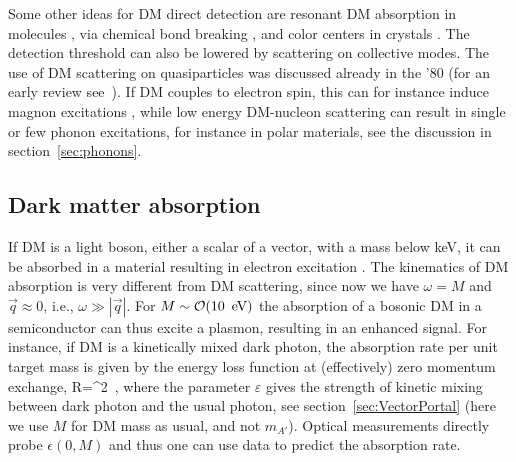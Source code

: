 Some other ideas for DM direct detection are resonant DM absorption in molecules  \cite{1709.05354}, via chemical bond breaking  \cite{1608.02940}, and color centers in crystals \cite{1705.03016}. 
The detection threshold can also be lowered by scattering on collective modes. 
The use of DM scattering on quasiparticles was discussed already in the '80 (for an early review see~\cite{Primack:1988zm}). 
If DM couples to electron spin, this can for instance induce magnon excitations \cite{1905.13744}, 
while low energy DM-nucleon scattering can result in single or few phonon excitations, for instance in polar materials, see the discussion in section~\ref{sec:phonons}.



\subsection{Dark matter absorption}
If DM is a light boson, either a scalar of a vector, with a mass below keV, it can be absorbed in a material resulting in electron excitation \cite{DM:electron:absorptions}. The kinematics of DM absorption is very different from DM scattering, since now we have $\omega=M$ and $\vec q\approx 0$, i.e., $\omega\gg |\vec q|$. For $M\sim {\mathcal O}(10\text{\, eV})$ the absorption of a bosonic DM in a semiconductor can thus excite a plasmon, resulting in an enhanced signal. For instance, if DM is a kinetically mixed dark photon, the absorption rate per unit target mass is given by the energy loss function at (effectively) zero momentum exchange, 
\beq
R=\varepsilon^2\, \Im{},
\eeq
where the parameter $\varepsilon$ gives the strength of kinetic mixing between dark photon and the usual photon, see section~\ref{sec:VectorPortal} (here we use $M$ for DM mass as usual, and not $m_{A'}$). Optical measurements directly probe $\epsilon(0,M)$ and thus one can use data to predict the absorption rate. 


